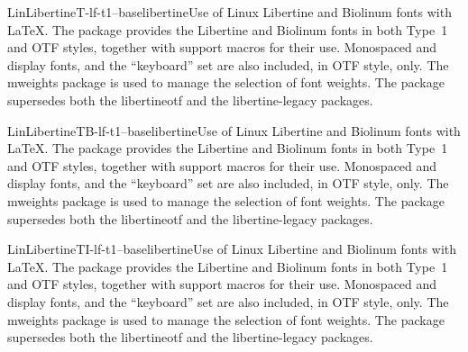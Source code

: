 \documentclass{ddltxtyp}
\begin{document}
\begin{package}{LinLibertineT-lf-t1--base}{libertine}{Use of Linux Libertine and Biolinum fonts with {\LaTeX}.}
The package provides the Libertine and Biolinum fonts in both
Type~1 and OTF styles, together with support macros for their
use. Monospaced and display fonts, and the ``keyboard'' set are
also included, in OTF style, only. The mweights package is used
to manage the selection of font weights. The package supersedes
both the libertineotf and the libertine-legacy packages.
\end{package}
\begin{package}{LinLibertineTB-lf-t1--base}{libertine}{Use of Linux Libertine and Biolinum fonts with {\LaTeX}.}
The package provides the Libertine and Biolinum fonts in both
Type~1 and OTF styles, together with support macros for their
use. Monospaced and display fonts, and the ``keyboard'' set are
also included, in OTF style, only. The mweights package is used
to manage the selection of font weights. The package supersedes
both the libertineotf and the libertine-legacy packages.
\end{package}
\begin{package}{LinLibertineTI-lf-t1--base}{libertine}{Use of Linux Libertine and Biolinum fonts with {\LaTeX}.}
The package provides the Libertine and Biolinum fonts in both
Type~1 and OTF styles, together with support macros for their
use. Monospaced and display fonts, and the ``keyboard'' set are
also included, in OTF style, only. The mweights package is used
to manage the selection of font weights. The package supersedes
both the libertineotf and the libertine-legacy packages.
\end{package}
\end{document}
